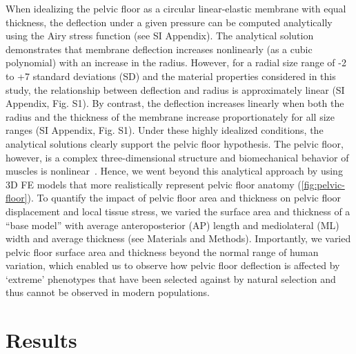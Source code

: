 \documentclass[9pt,twocolumn,twoside]{pnas-new}
\begin{document}
When idealizing the pelvic floor as a circular linear-elastic membrane with equal thickness, the deflection under a given pressure can be computed analytically using the Airy stress function (see SI Appendix). The analytical solution demonstrates that membrane deflection increases nonlinearly (as a cubic polynomial) with an increase in the radius. However, for a radial size range of -2 to +7 standard deviations (SD) and the material properties considered in this study, the relationship between deflection and radius is approximately linear (SI Appendix, Fig. S1). By contrast, the deflection increases linearly when both the radius and the thickness of the membrane increase proportionately for all size ranges (SI Appendix, Fig. S1). Under these highly idealized conditions, the analytical solutions clearly support the pelvic floor hypothesis. The pelvic floor, however, is a complex three-dimensional structure and biomechanical behavior of muscles is nonlinear~\cite{Humphrey2003-rb}. Hence, we went beyond this analytical approach by using 3D FE models that more realistically represent pelvic floor anatomy (\cref{fig:pelvic-floor}). To quantify the impact of pelvic floor area and thickness on pelvic floor displacement and local tissue stress, we varied the surface area and thickness of a ``base model” with average anteroposterior (AP) length and mediolateral (ML) width and average thickness (see Materials and Methods). Importantly, we varied pelvic floor surface area and thickness beyond the normal range of human variation, which enabled us to observe how pelvic floor deflection is affected by `extreme’ phenotypes that have been selected against by natural selection and thus cannot be observed in modern populations.

\section*{Results}
\end{document}
